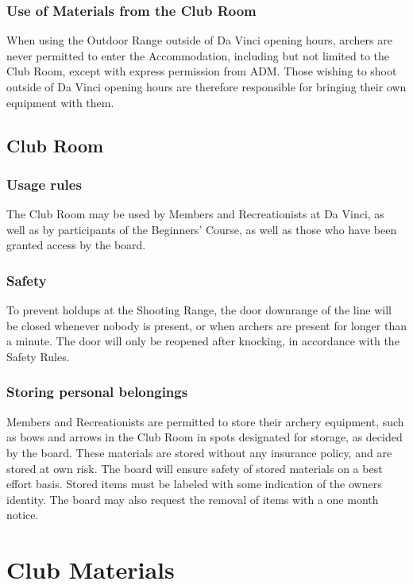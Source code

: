 \documentclass[a4paper]{article}
\newcommand{\Asr}{Safety Rules} %
\begin{document}
\subsubsection{Use of Materials from the Club Room}
When using the Outdoor Range outside of Da Vinci opening hours, { archers} are never permitted to enter the { Accommodation}, including but not limited to the { Club Room}, except with express permission from { ADM}. Those wishing to shoot outside of Da Vinci opening hours are therefore responsible for bringing their own equipment with them.

\subsection{Club Room}
\subsubsection{Usage rules}
The { Club Room} may be used by { Members} and { Recreationists} at Da Vinci, as well as by participants of the { Beginners' Course}, as well as those who have been granted access by the board. 

\subsubsection{Safety}
To prevent holdups at the Shooting Range, the door { downrange of the line} will be closed whenever nobody is present, or when { archers} are present for longer than a minute. The door will only be reopened after knocking, in accordance with the { \Asr}.

\subsubsection{Storing personal belongings}
{ Members} and { Recreationists} are permitted to store their archery equipment, such as bows and arrows in the { Club Room} in spots designated for storage, as decided by the board. These materials are stored without any insurance policy, and are stored at own risk. The board will ensure safety of stored materials on a best effort basis. Stored items must be labeled with some indication of the owners identity. The board may also request the removal of items with a one month notice.

\section{Club Materials}
\end{document}
